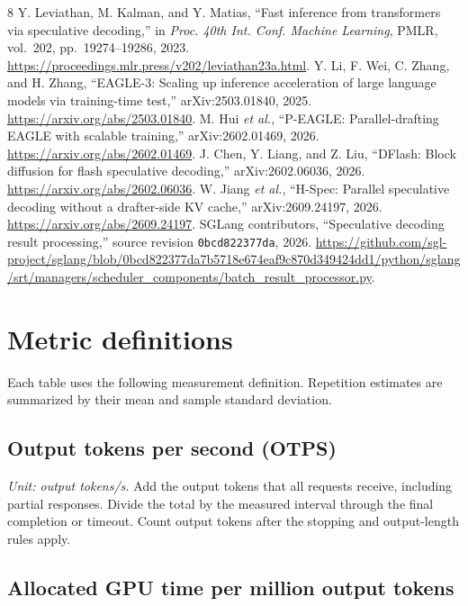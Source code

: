 \documentclass[conference,onecolumn]{IEEEtran}
\begin{document}
\begin{thebibliography}{8}
Y. Leviathan, M. Kalman, and Y. Matias, ``Fast inference from transformers via speculative decoding,'' in \emph{Proc. 40th Int. Conf. Machine Learning}, PMLR, vol.~202, pp.~19274--19286, 2023. \url{https://proceedings.mlr.press/v202/leviathan23a.html}.
Y. Li, F. Wei, C. Zhang, and H. Zhang, ``EAGLE-3: Scaling up inference acceleration of large language models via training-time test,'' arXiv:2503.01840, 2025. \url{https://arxiv.org/abs/2503.01840}.
M. Hui \emph{et al.}, ``P-EAGLE: Parallel-drafting EAGLE with scalable training,'' arXiv:2602.01469, 2026. \url{https://arxiv.org/abs/2602.01469}.
J. Chen, Y. Liang, and Z. Liu, ``DFlash: Block diffusion for flash speculative decoding,'' arXiv:2602.06036, 2026. \url{https://arxiv.org/abs/2602.06036}.
W. Jiang \emph{et al.}, ``H-Spec: Parallel speculative decoding without a drafter-side KV cache,'' arXiv:2609.24197, 2026. \url{https://arxiv.org/abs/2609.24197}.
SGLang contributors, ``Speculative decoding result processing,'' source revision \texttt{0bcd822377da}, 2026. \url{https://github.com/sgl-project/sglang/blob/0bcd822377da7b5718e674eaf9c870d349424dd1/python/sglang/srt/managers/scheduler_components/batch_result_processor.py}.
\end{thebibliography}

\clearpage
\appendices
\section{Metric definitions}
Each table uses the following measurement definition. Repetition estimates are summarized by their mean and sample standard deviation.

\subsection{Output tokens per second (OTPS)}

\textit{Unit: output tokens/s.} Add the output tokens that all requests receive, including partial responses. Divide the total by the measured interval through the final completion or timeout. Count output tokens after the stopping and output-length rules apply.

\subsection{Allocated GPU time per million output tokens}
\end{document}
